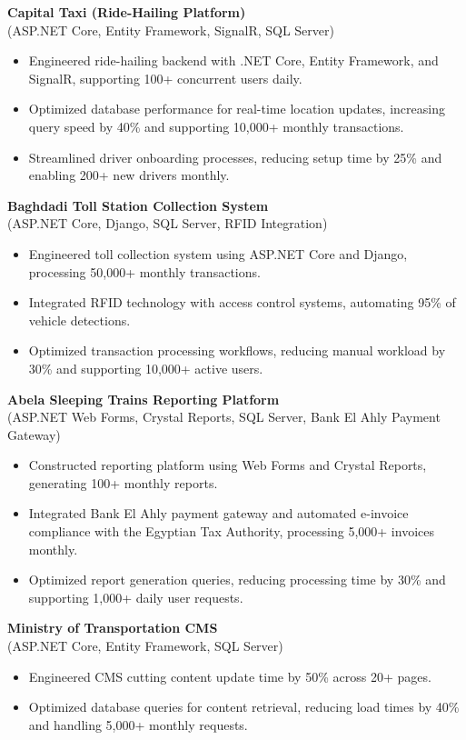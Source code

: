 \documentclass[11pt,a4paper]{article}
\begin{document}
\textbf{Capital Taxi (Ride-Hailing Platform)} \\
(ASP.NET Core, Entity Framework, SignalR, SQL Server)
\begin{itemize}
    \item Engineered ride-hailing backend with .NET Core, Entity Framework, and SignalR, supporting 100+ concurrent users daily.
    \item Optimized database performance for real-time location updates, increasing query speed by 40\% and supporting 10,000+ monthly transactions.
    \item Streamlined driver onboarding processes, reducing setup time by 25\% and enabling 200+ new drivers monthly.
\end{itemize}

\textbf{Baghdadi Toll Station Collection System} \\
(ASP.NET Core, Django, SQL Server, RFID Integration)
\begin{itemize}
    \item Engineered toll collection system using ASP.NET Core and Django, processing 50,000+ monthly transactions.
    \item Integrated RFID technology with access control systems, automating 95\% of vehicle detections.
    \item Optimized transaction processing workflows, reducing manual workload by 30\% and supporting 10,000+ active users.
\end{itemize}

\textbf{Abela Sleeping Trains Reporting Platform} \\
(ASP.NET Web Forms, Crystal Reports, SQL Server, Bank El Ahly Payment Gateway)
\begin{itemize}
    \item Constructed reporting platform using Web Forms and Crystal Reports, generating 100+ monthly reports.
    \item Integrated Bank El Ahly payment gateway and automated e-invoice compliance with the Egyptian Tax Authority, processing 5,000+ invoices monthly.
    \item Optimized report generation queries, reducing processing time by 30\% and supporting 1,000+ daily user requests.
\end{itemize}

\textbf{Ministry of Transportation CMS} \\
(ASP.NET Core, Entity Framework, SQL Server)
\begin{itemize}
    \item Engineered CMS cutting content update time by 50\% across 20+ pages.
    \item Optimized database queries for content retrieval, reducing load times by 40\% and handling 5,000+ monthly requests.
\end{itemize}
\end{document}
